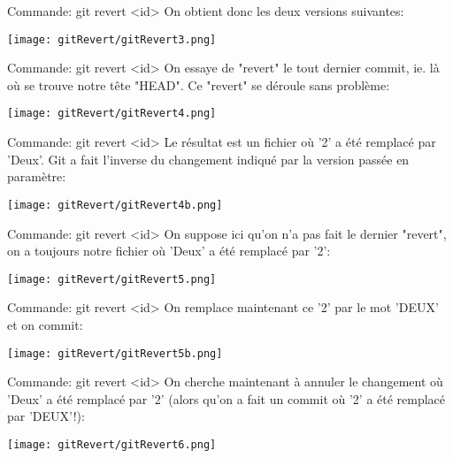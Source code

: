 \documentclass{beamer}
\begin{document}
\begin{frame}{Commande: git revert <id>}
On obtient donc les deux versions suivantes:
\begin{center}
	\texttt{[image: gitRevert/gitRevert3.png]}
\end{center}
\end{frame}

\begin{frame}{Commande: git revert <id>}
On essaye de "revert" le tout dernier commit, ie. là où se trouve notre tête "HEAD". Ce "revert" se déroule sans problème:
\begin{center}
	\texttt{[image: gitRevert/gitRevert4.png]}
\end{center}
\end{frame}

\begin{frame}{Commande: git revert <id>}
Le résultat est un fichier où '2' a été remplacé par 'Deux'. Git a fait l'inverse du changement indiqué par la version passée en paramètre:
\begin{center}
	\texttt{[image: gitRevert/gitRevert4b.png]}
\end{center}
\end{frame}

\begin{frame}{Commande: git revert <id>}
On suppose ici qu'on n'a pas fait le dernier "revert", on a toujours notre fichier où 'Deux' a été remplacé par '2':
\begin{center}
	\texttt{[image: gitRevert/gitRevert5.png]}
\end{center}
\end{frame}

\begin{frame}{Commande: git revert <id>}
On remplace maintenant ce '2' par le mot 'DEUX' et on commit:
\begin{center}
	\texttt{[image: gitRevert/gitRevert5b.png]}
\end{center}
\end{frame}

\begin{frame}{Commande: git revert <id>}
On cherche maintenant à annuler le changement où 'Deux' a été remplacé par '2' (alors qu'on a fait un commit où '2' a été remplacé par 'DEUX'!):
\begin{center}
	\texttt{[image: gitRevert/gitRevert6.png]}
\end{center}
\end{frame}
\end{document}
